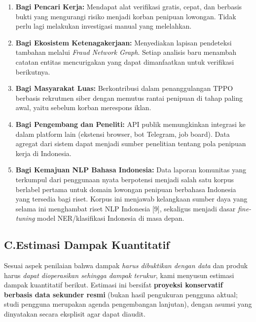 \documentclass[12pt,a4paper]{article}
\begin{document}
\begin{enumerate}[label=\textbf{\arabic*.}]
\item \textbf{Bagi Pencari Kerja:} Mendapat alat verifikasi gratis, cepat, dan berbasis bukti yang
      mengurangi risiko menjadi korban penipuan lowongan. Tidak perlu lagi melakukan investigasi
      manual yang melelahkan.

\item \textbf{Bagi Ekosistem Ketenagakerjaan:} Menyediakan lapisan pendeteksi tambahan melalui
      \textit{Fraud Network Graph}. Setiap analisis baru menambah catatan entitas mencurigakan
      yang dapat dimanfaatkan untuk verifikasi berikutnya.

\item \textbf{Bagi Masyarakat Luas:} Berkontribusi dalam penanggulangan TPPO berbasis
      rekrutmen siber dengan memutus rantai penipuan di tahap paling awal, yaitu sebelum
      korban merespons iklan.

\item \textbf{Bagi Pengembang dan Peneliti:} API publik memungkinkan integrasi ke dalam platform
      lain (ekstensi browser, bot Telegram, job board). Data agregat dari sistem dapat menjadi
      sumber penelitian tentang pola penipuan kerja di Indonesia.

\item \textbf{Bagi Kemajuan NLP Bahasa Indonesia:} Data laporan komunitas yang terkumpul dari
      penggunaan nyata berpotensi menjadi salah satu korpus berlabel pertama untuk domain lowongan
      penipuan berbahasa Indonesia yang tersedia bagi riset. Korpus ini menjawab kelangkaan sumber
      daya yang selama ini menghambat riset NLP Indonesia [9], sekaligus menjadi dasar
      \textit{fine-tuning} model NER/klasifikasi Indonesia di masa depan.
\end{enumerate}

\subsection*{C.\quad Estimasi Dampak Kuantitatif}

Sesuai aspek penilaian bahwa dampak \emph{harus dibuktikan dengan data} dan produk harus
\emph{dapat dioperasikan sehingga dampak terukur}, kami menyusun estimasi dampak kuantitatif
berikut. Estimasi ini bersifat \textbf{proyeksi konservatif berbasis data sekunder resmi}
(bukan hasil pengukuran pengguna aktual; studi pengguna merupakan agenda pengembangan lanjutan),
dengan asumsi yang dinyatakan secara eksplisit agar dapat diaudit.
\end{document}
